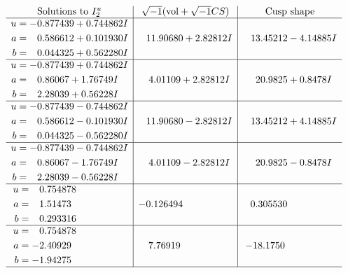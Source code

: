 \documentclass[1p]{elsarticle_modified}
\theoremstyle{definition}
\newcommand{\I}{\sqrt{-1}}
\begin{document}
$$\begin{array}{c|c|c}  
\text{Solutions to }I^u_{2}& \I (\text{vol} + \sqrt{-1}CS) & \text{Cusp shape}\\
 \hline 
\begin{aligned}
u &= -0.877439 + 0.744862 I \\
a &= \phantom{-}0.586612 + 0.101930 I \\
b &= \phantom{-}0.044325 + 0.562280 I\end{aligned}
 & \phantom{-}11.90680 + 2.82812 I & \phantom{-}13.45212 - 4.14885 I \\ \hline\begin{aligned}
u &= -0.877439 + 0.744862 I \\
a &= \phantom{-}0.86067 + 1.76749 I \\
b &= \phantom{-}2.28039 + 0.56228 I\end{aligned}
 & \phantom{-}4.01109 + 2.82812 I & \phantom{-}20.9825 + 0.8478 I \\ \hline\begin{aligned}
u &= -0.877439 - 0.744862 I \\
a &= \phantom{-}0.586612 - 0.101930 I \\
b &= \phantom{-}0.044325 - 0.562280 I\end{aligned}
 & \phantom{-}11.90680 - 2.82812 I & \phantom{-}13.45212 + 4.14885 I \\ \hline\begin{aligned}
u &= -0.877439 - 0.744862 I \\
a &= \phantom{-}0.86067 - 1.76749 I \\
b &= \phantom{-}2.28039 - 0.56228 I\end{aligned}
 & \phantom{-}4.01109 - 2.82812 I & \phantom{-}20.9825 - 0.8478 I \\ \hline\begin{aligned}
u &= \phantom{-}0.754878\phantom{ +0.000000I} \\
a &= \phantom{-}1.51473\phantom{ +0.000000I} \\
b &= \phantom{-}0.293316\phantom{ +0.000000I}\end{aligned}
 & -0.126494\phantom{ +0.000000I} & \phantom{-}0.305530\phantom{ +0.000000I} \\ \hline\begin{aligned}
u &= \phantom{-}0.754878\phantom{ +0.000000I} \\
a &= -2.40929\phantom{ +0.000000I} \\
b &= -1.94275\phantom{ +0.000000I}\end{aligned}
 & \phantom{-}7.76919\phantom{ +0.000000I} & -18.1750\phantom{ +0.000000I}\\
 \hline 
 \end{array}$$\newpage\newpage\renewcommand{\arraystretch}{1}
\end{document}

